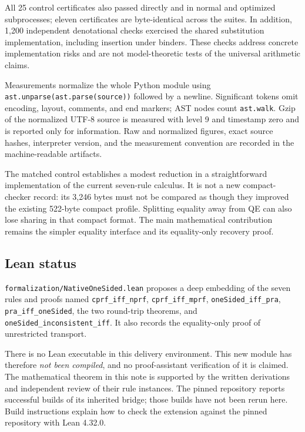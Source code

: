 \documentclass[11pt]{article}
\theoremstyle{definition}\newtheorem{definition}[theorem]{Definition}
\theoremstyle{remark}\newtheorem{remark}[theorem]{Remark}
\begin{document}
All 25 control certificates also passed directly and in normal and
optimized subprocesses; eleven certificates are byte-identical across
the suites. In addition, 1,200 independent denotational checks exercised
the shared substitution implementation, including insertion under
binders. These checks address concrete implementation risks and are not
model-theoretic tests of the universal arithmetic claims.

Measurements normalize the whole Python module using
\texttt{ast.unparse(ast.parse(source))} followed by a newline. Significant
tokens omit encoding, layout, comments, and end markers; AST nodes count
\texttt{ast.walk}. Gzip of the normalized UTF-8 source is measured with level 9 and
timestamp zero and
is reported only for information. Raw and normalized figures, exact
source hashes, interpreter version, and the measurement convention are
recorded in the machine-readable artifacts.

The matched control establishes a modest reduction in a straightforward
implementation of the current seven-rule calculus. It is not a new
compact-checker record: its 3,246 bytes must not be compared as though
they improved the existing 522-byte compact profile. Splitting equality
away from QE can also lose sharing in that compact format. The main
mathematical contribution remains the simpler equality interface and
its equality-only recovery proof.

\subsection{Lean status}

\texttt{formalization/NativeOneSided.lean} proposes a deep embedding of
the seven rules and proofs named
\texttt{cprf\_iff\_nprf}, \texttt{cprf\_iff\_mprf},
\texttt{oneSided\_iff\_pra}, \texttt{pra\_iff\_oneSided},
the two round-trip theorems, and \texttt{oneSided\_inconsistent\_iff}.
It also records the equality-only proof of unrestricted transport.

There is no Lean executable in this delivery environment. This new
module has therefore \emph{not been compiled}, and no proof-assistant
verification of it is claimed. The mathematical theorem in this note
is supported by the written derivations and independent review of their
rule instances. The pinned repository reports successful builds of its
inherited bridge; those builds have not been rerun here. Build
instructions explain how to check the extension against the pinned
repository with Lean 4.32.0.
\end{document}
